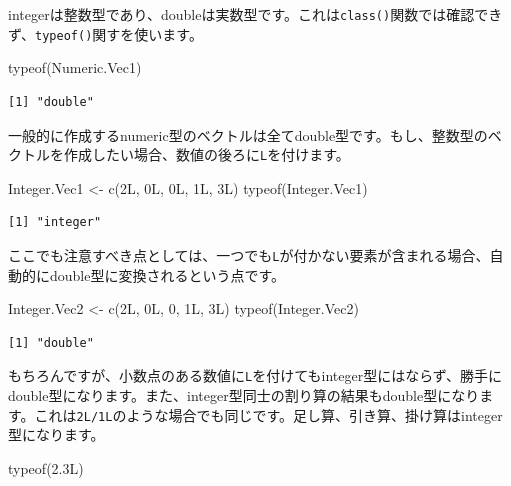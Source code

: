 \documentclass[
  a4paper,
  pandoc,
  ja=standard,
  jafont=haranoaji]{bxjsbook}
\newenvironment{Shaded}{\begin{snugshade}}{\end{snugshade}}
\newcommand{\DecValTok}[1]{\textcolor[rgb]{0.68,0.00,0.00}{#1}}
\newcommand{\FloatTok}[1]{\textcolor[rgb]{0.68,0.00,0.00}{#1}}
\newcommand{\FunctionTok}[1]{\textcolor[rgb]{0.28,0.35,0.67}{#1}}
\newcommand{\NormalTok}[1]{\textcolor[rgb]{0.00,0.48,0.65}{#1}}
\newcommand{\OtherTok}[1]{\textcolor[rgb]{0.00,0.48,0.65}{#1}}
\begin{document}
integerは整数型であり、doubleは実数型です。これは\texttt{class()}関数では確認できず、\texttt{typeof()}関すを使います。

\begin{Shaded}
\begin{Highlighting}[numbers=left,,]
\FunctionTok{typeof}\NormalTok{(Numeric.Vec1)}
\end{Highlighting}
\end{Shaded}

\begin{verbatim}
[1] "double"
\end{verbatim}

一般的に作成するnumeric型のベクトルは全てdouble型です。もし、整数型のベクトルを作成したい場合、数値の後ろに\texttt{L}を付けます。

\begin{Shaded}
\begin{Highlighting}[numbers=left,,]
\NormalTok{Integer.Vec1 }\OtherTok{\textless{}{-}} \FunctionTok{c}\NormalTok{(2L, 0L, 0L, 1L, 3L)}
\FunctionTok{typeof}\NormalTok{(Integer.Vec1)}
\end{Highlighting}
\end{Shaded}

\begin{verbatim}
[1] "integer"
\end{verbatim}

ここでも注意すべき点としては、一つでも\texttt{L}が付かない要素が含まれる場合、自動的にdouble型に変換されるという点です。

\begin{Shaded}
\begin{Highlighting}[numbers=left,,]
\NormalTok{Integer.Vec2 }\OtherTok{\textless{}{-}} \FunctionTok{c}\NormalTok{(2L, 0L, }\DecValTok{0}\NormalTok{, 1L, 3L)}
\FunctionTok{typeof}\NormalTok{(Integer.Vec2)}
\end{Highlighting}
\end{Shaded}

\begin{verbatim}
[1] "double"
\end{verbatim}

もちろんですが、小数点のある数値に\texttt{L}を付けてもinteger型にはならず、勝手にdouble型になります。また、integer型同士の割り算の結果もdouble型になります。これは\texttt{2L/1L}のような場合でも同じです。足し算、引き算、掛け算はinteger型になります。

\begin{Shaded}
\begin{Highlighting}[numbers=left,,]
\FunctionTok{typeof}\NormalTok{(}\FloatTok{2.3}\NormalTok{L)}
\end{Highlighting}
\end{Shaded}
\end{document}
